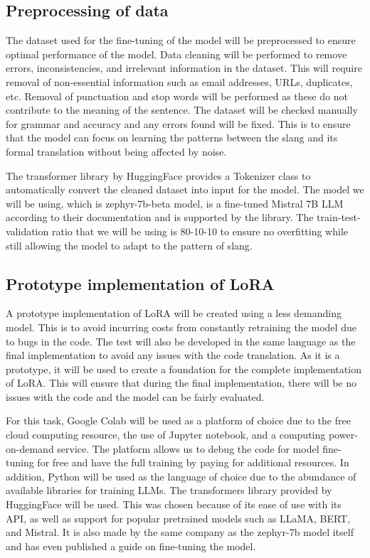 \subsection{Preprocessing of data} 
The dataset used for the fine-tuning of the model will be preprocessed to ensure optimal performance of the model.
Data cleaning will be performed to remove errors, inconsistencies, and irrelevant information in the dataset.
This will require removal of non-essential information such as email addresses, URLs, duplicates, etc.
Removal of punctuation and stop words will be performed as these do not contribute to the meaning of the sentence.
The dataset will be checked manually for grammar and accuracy and any errors found will be fixed. 
This is to ensure that the model can focus on learning the patterns between the slang and its formal translation without being affected by noise.

The transformer library by HuggingFace provides a Tokenizer class to automatically convert the cleaned dataset into input for the model.
The model we will be using, which is zephyr-7b-beta model, is a fine-tuned Mistral 7B LLM according to their documentation and is supported by the library.
The train-test-validation ratio that we will be using is 80-10-10 to ensure no overfitting while still allowing the model to adapt to the pattern of slang.  

\subsection{Prototype implementation of LoRA}
A prototype implementation of LoRA will be created using a less demanding model.
This is to avoid incurring costs from constantly retraining the model due to bugs in the code.
The test will also be developed in the same language as the final implementation to avoid any issues with the code translation.
As it is a prototype, it will be used to create a foundation for the complete implementation of LoRA.
This will ensure that during the final implementation, there will be no issues with the code and the model can be fairly evaluated.

For this task, Google Colab will be used as a platform of choice due to the free cloud computing resource, the use of Jupyter notebook, and a computing power-on-demand service. The platform allows us to debug the code for model fine-tuning for free and have the full training by paying for additional resources.
In addition, Python will be used as the language of choice due to the abundance of available libraries for training LLMs. The transformers library provided by HuggingFace will be used.
This was chosen because of its ease of use with its API, as well as support for popular pretrained models such as LLaMA, BERT, and Mistral.
It is also made by the same company as the zephyr-7b model itself and has even published a guide on fine-tuning the model.

